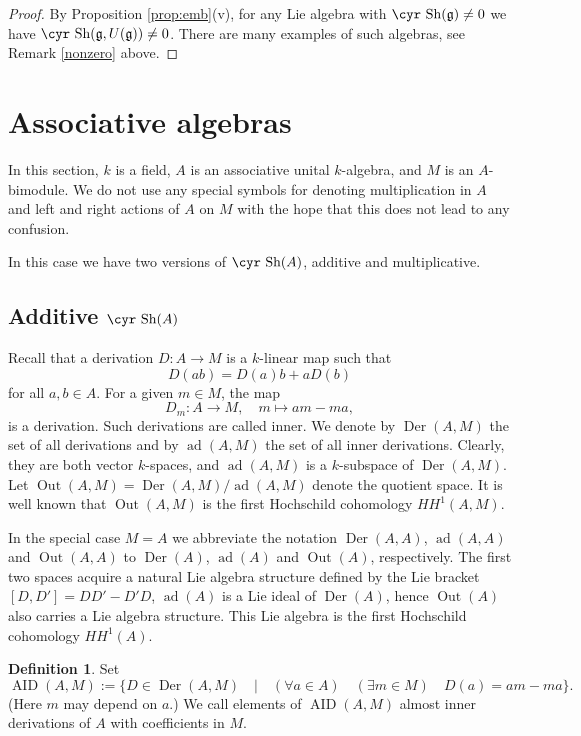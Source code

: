 \documentclass[11pt,reqno]{amsart}
\numberwithin{equation}{section}
\theoremstyle{definition}
\newtheorem{definition}[theorem]{Definition}
\newcommand{\Out}{{\operatorname{ Out}}}
\newcommand{\AID}{{\operatorname{ AID}}}
\newcommand{\Der}{{\operatorname{ Der}}}
\newcommand{\ad}{{\operatorname{ ad}}}
\def\Sha{\text{\cyr Sh}}
\def\g{\mathfrak g}
\begin{document}
\begin{proof}
By Proposition \ref{prop:emb}(v), for any Lie algebra with $\Sha (\g)\ne 0$ we have
$\Sha (\g, U(\g ))\ne 0$. There are many examples of such algebras, see Remark
\ref{nonzero} above.
\end{proof}





\section{Associative algebras} \label{sec:ass}

In this section, $k$ is a field, $A$ is an associative unital $k$-algebra,
and $M$ is an $A$-bimodule. We do not use any special symbols
for denoting multiplication in $A$ and left and right actions
of $A$ on $M$ with the hope that this does not lead to any confusion.

In this case we have two versions of $\Sha (A)$, additive and
multiplicative.


\subsection{Additive $\Sha (A)$} \label{subsec:add}

Recall that a derivation $D\colon A\to M$ is a $k$-linear map
such that
$$
D(ab)=D(a)b+aD(b)
$$
for all $a,b\in A$. For a given $m\in M$, the map
$$
D_m\colon A\to M, \quad m\mapsto am-ma,
$$
is a derivation. Such derivations are called inner. We denote by
$\Der (A,M)$ the set of all derivations and by $\ad (A,M)$ the
set of all inner derivations. Clearly, they are both vector $k$-spaces,
and $\ad (A,M)$ is a $k$-subspace of $\Der (A,M)$. Let $\Out (A,M)=\Der (A,M)/\ad (A,M)$
denote the quotient space. It is well known that $\Out (A,M)$ is the first
Hochschild cohomology $HH^1(A,M)$.

In the special case
$M=A$ we abbreviate the notation $\Der (A,A)$, $\ad (A,A)$ and $\Out (A,A)$ to
$\Der (A)$, $\ad (A)$ and $\Out (A)$, respectively. The first two spaces acquire a natural Lie algebra
structure defined by the Lie bracket $[D,D']=DD'-D'D$, $\ad (A)$ is a Lie ideal
of $\Der (A)$, hence $\Out (A)$ also carries a Lie algebra structure. This Lie algebra is
the first Hochschild cohomology $HH^1(A)$.


\begin{definition} \label{def:lid-ass}
Set
$$
\AID (A,M):= \{D\in \Der (A,M) \quad | \quad (\forall a\in A) \quad  (\exists m\in M) \quad D(a)=am-ma\}.
$$
(Here $m$ may depend on $a$.) We call elements of $\AID (A,M)$ almost inner derivations
of $A$ with coefficients in $M$.
\end{definition}
\end{document}

